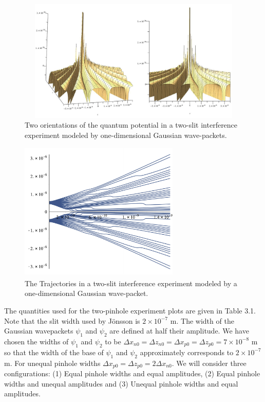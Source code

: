 \documentclass[12pt]{article}       %
\begin{document}
\begin{figure}[h]
\unitlength=1in
\hspace*{0.7in}\includegraphics[width=4.6in,height=2.3in]  {figure4.jpg}  
\caption{Two orientations of the quantum potential in a two-slit  interference experiment modeled by  one-dimensional Gaussian wave-packets.\label{QP1DG}}
\end{figure}
\begin{figure}[h]
\unitlength=1in
\hspace*{1.4in}\includegraphics[width=3in,height=2.6in]  {figure5v3_3.pdf}  %
\vspace*{0.0in}%
\caption{The Trajectories in a two-slit interference experiment modeled by a one-dimensional Gaussian wave-packet.\label{TRAJ1DG}}
\end{figure}
The quantities used for the two-pinhole experiment plots are given in Table 3.1. Note that the slit width used by J\"{o}nsson is $2\times 10^{-7}$ m. The width of the Gaussian 
wavepackets $\psi_1$ and $\psi_2$ are defined at half their amplitude. We have chosen the widths of $\psi_1$ and $\psi_2$ to be $\Delta x_{n0}=\Delta z_{n0}=\Delta x_{p0}=\Delta z_{p0}=7\times 10^{-8}$ m so that the width of the base of $\psi_1$ and $\psi_2$ approximately corresponds to $2\times10^{-7}$ m. For unequal pinhole widths  $\Delta x_{p0}=\Delta z_{p0}=2\Delta x_{n0}$. We will consider three configurations: (1) Equal pinhole widths and equal amplitudes, (2) Equal pinhole widths and unequal amplitudes and (3) Unequal pinhole widths and equal amplitudes. 
\end{document}
